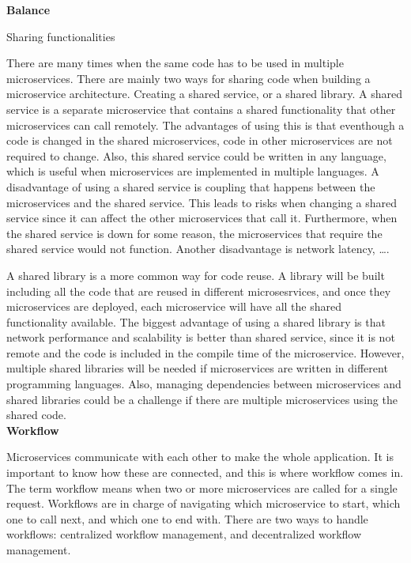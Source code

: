 \noindent \textbf{Balance}

\noindent Sharing functionalities

There are many times when the same code has to be used in multiple microservices. 
There are mainly two ways for sharing code when building a microservice architecture. 
Creating a shared service, or a shared library.  
A shared service is a separate microservice that contains a shared functionality that other microservices can call remotely.
The advantages of using this is that eventhough a code is changed in the shared microservices, code in other microservices are not required to change.
Also, this shared service could be written in any language, which is useful when microservices are implemented in multiple languages. 
A disadvantage of using a shared service is coupling that happens between the microservices and the shared service. 
This leads to risks when changing a shared service since it can affect the other microservices that call it.
Furthermore, when the shared service is down for some reason, the microservices that require the shared service would not function.
Another disadvantage is network latency, ….

A shared library is a more common way for code reuse. A library will be built including all the code that are reused in different microsesrvices,
and once they microservices are deployed, each microservice will have all the shared functionality available. 
The biggest advantage of using a shared library is that network performance and scalability is better than shared service, 
since it is not remote and the code is included in the compile time of the microservice. 
However, multiple shared libraries will be needed if microservices are written in different programming languages. 
Also, managing dependencies between microservices and shared libraries could be a challenge if there are multiple microservices using the shared code. \\


\noindent \textbf{Workflow}

Microservices communicate with each other to make the whole application. It is important to know how these are connected, 
and this is where workflow comes in.
The term workflow means when two or more microservices are called for a single request. 
Workflows are in charge of navigating which microservice to start, which one to call next, and which one to end with.
There are two ways to handle workflows: centralized workflow management, and decentralized workflow management. 

